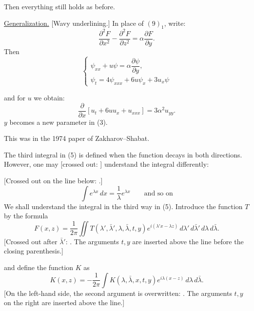 Then everything still holds as before.

\underline{Generalization.} [Wavy underlining.] In place of $(9)_1$, write:
\begin{equation*}
\frac{\partial^2F}{\partial x^2}-\frac{\partial^2F}{\partial z^2}
=\alpha\frac{\partial F}{\partial y}. \tag{10}
\end{equation*}
Then
\begin{equation*}
\begin{cases}
\psi_{xx}+u\psi=\alpha\dfrac{\partial\psi}{\partial y},\\[4pt]
\psi_t=4\psi_{xxx}+6u\psi_x+3u_x\psi
\end{cases} \tag{11}
\end{equation*}

and for $u$ we obtain:
\begin{equation*}
\frac{\partial}{\partial x}\left[u_t+6uu_x+u_{xxx}\right]=3\alpha^2u_{yy}. \tag{12}
\end{equation*}
$y$ becomes a new parameter in (3).

This was in the 1974 paper of Zakharov--Shabat.

The third integral in (5) is defined when the function decays in both directions.
However, one may [crossed out:
]
understand the integral differently:

[Crossed out on the line below:
.]
\begin{equation*}
\int e^{\lambda x}\,dx=\frac1\lambda e^{\lambda x}\qquad\text{and so on} \tag{13}
\end{equation*}
We shall understand the integral in the third way in (5).
Introduce the function $T$ by the formula
\begin{equation*}
F(x,z)=\frac1{2\pi}\iint
T(\lambda',\bar\lambda',\lambda,\bar\lambda,t,y)
 e^{i(\lambda'x-\lambda z)}\,d\lambda'\,d\bar\lambda'\,d\lambda\,d\bar\lambda. \tag{14}
\end{equation*}
[Crossed out after $\bar\lambda'$:
.
The arguments $t,y$ are inserted above the line before the closing parenthesis.]

and define the function $K$ as
\begin{equation*}
K(x,z)=-\frac1{2\pi}\int K(\lambda,\bar\lambda,x,t,y)
 e^{i\lambda(x-z)}\,d\lambda\,d\bar\lambda. \tag{15}
\end{equation*}
[On the left-hand side, the second argument is overwritten:
.
The arguments $t,y$ on the right are inserted above the line.]

